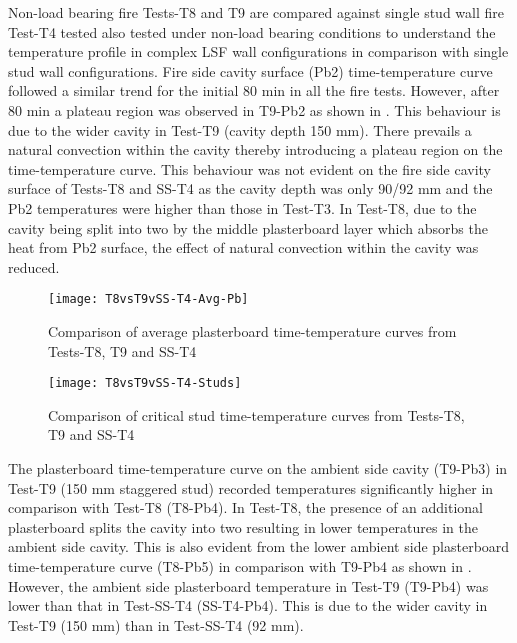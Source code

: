 Non-load bearing fire Tests-T8 and T9 are compared against single stud wall fire Test-T4 tested also tested under non-load bearing conditions to understand the temperature profile in complex LSF wall configurations in comparison with single stud wall configurations. Fire side cavity surface (Pb2) time-temperature curve followed a similar trend for the initial 80 min in all the fire tests. However, after 80 min a plateau region was observed in T9-Pb2 as shown in . This behaviour is due to the wider cavity in Test-T9 (cavity depth 150 mm). There prevails a natural convection within the cavity thereby introducing a plateau region on the time-temperature curve. This behaviour was not evident on the fire side cavity surface of Tests-T8 and SS-T4 as the cavity depth was only 90/92 mm and the Pb2 temperatures were higher than those in Test-T3. In Test-T8, due to the cavity being split into two by the middle plasterboard layer which absorbs the heat from Pb2 surface, the effect of natural convection within the cavity was reduced.
\begin{figure}[!htbp]
	\centering
		\texttt{[image: T8vsT9vSS-T4-Avg-Pb]}  
	\caption{Comparison of average plasterboard time-temperature curves from Tests-T8, T9 and SS-T4}
	\label{fig:T8vsT9vSS-T4-Avg-Pb}
\end{figure}
\begin{figure}[!htbp]
	\centering
		\texttt{[image: T8vsT9vSS-T4-Studs]}  
	\caption{Comparison of critical stud time-temperature curves from Tests-T8, T9 and SS-T4}
	\label{fig:T8vsT9vSS-T4-Studs}
\end{figure}

The plasterboard time-temperature curve on the ambient side cavity (T9-Pb3) in Test-T9 (150 mm staggered stud) recorded temperatures significantly higher in comparison with Test-T8 (T8-Pb4). In Test-T8, the presence of an additional plasterboard splits the cavity into two resulting in lower temperatures in the ambient side cavity. This is also evident from the lower ambient side plasterboard time-temperature curve (T8-Pb5) in comparison with T9-Pb4 as shown in . However, the ambient side plasterboard temperature in Test-T9 (T9-Pb4) was lower than that in Test-SS-T4 (SS-T4-Pb4). This is due to the wider cavity in Test-T9 (150 mm) than in Test-SS-T4 (92 mm).

